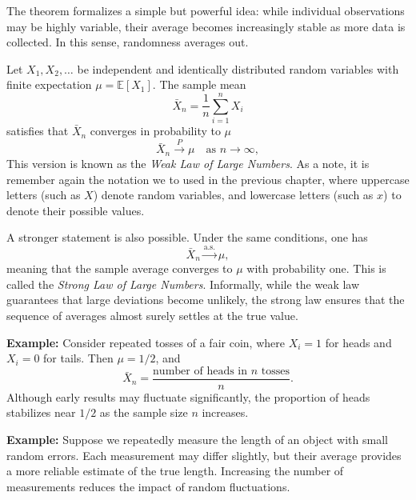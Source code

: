 \medskip

The theorem formalizes a simple but powerful idea: while individual observations may be highly variable, their average becomes increasingly stable as more data is collected. In this sense, randomness averages out.

\medskip

Let $X_1, X_2, \dots$ be independent and identically distributed random variables with finite expectation $\mu = \mathbb{E}[X_1]$. The sample mean
\begin{equation}
    \bar{X}_n = \frac{1}{n}\sum_{i=1}^n X_i
\end{equation}
satisfies that $\bar{X}_n$ converges in probability to $\mu$
\begin{equation}
    \bar{X}_n \xrightarrow{P} \mu \quad \text{as } n \to \infty,
\end{equation}
This version is known as the \textit{Weak Law of Large Numbers}. As a note, it is remember again the notation we to used in the previous chapter, where uppercase letters (such as $X$) denote random variables, and lowercase letters (such as $x$) to denote their possible values.

\medskip

A stronger statement is also possible. Under the same conditions, one has
\begin{equation}
    \bar{X}_n \xrightarrow{\text{a.s.}} \mu,
\end{equation}
meaning that the sample average converges to $\mu$ with probability one. This is called the \textit{Strong Law of Large Numbers}. Informally, while the weak law guarantees that large deviations become unlikely, the strong law ensures that the sequence of averages almost surely settles at the true value.

\medskip

\textbf{Example:} Consider repeated tosses of a fair coin, where $X_i = 1$ for heads and $X_i = 0$ for tails. Then $\mu = 1/2$, and
\[
\bar{X}_n = \frac{\text{number of heads in } n \text{ tosses}}{n}.
\]
Although early results may fluctuate significantly, the proportion of heads stabilizes near $1/2$ as the sample size $n$ increases.

\medskip

\textbf{Example:} Suppose we repeatedly measure the length of an object with small random errors. Each measurement may differ slightly, but their average provides a more reliable estimate of the true length. Increasing the number of measurements reduces the impact of random fluctuations.

